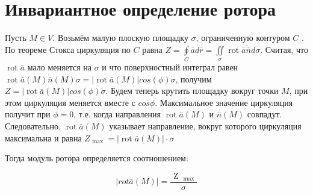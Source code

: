 \section{Инвариантное определение ротора}

Пусть $M \in V$. Возьмём малую плоскую площадку $\sigma$, ограниченную контуром  $C$ .
 По теореме Стокса циркуляция по $C$ равна $Z = \oint \limits_C \bar a d\bar r = \iint\limits _{\sigma}\operatorname{rot} \bar a\dot \bar n d\sigma$. 
Считая, что $\operatorname{rot} \bar a$ мало меняется на $\sigma$ и что поверхностный интеграл равен $\operatorname{rot} \bar a(M)\dot \bar n(M)\sigma = |\operatorname{rot} \bar a(M)|cos(\phi)\dot \sigma$, 
получим $Z=|\operatorname{rot} \bar a(M)|cos(\phi)\dot\sigma$.
Будем теперь крутить площадку вокруг точки  $M$, при этом циркуляция меняется вместе с $cos\phi$. Максимальное значение циркуляция получит при $\phi=0$, т.е. когда направления $\operatorname{rot} \bar a(M)$ и $\bar n(M)$ совпадут. Следовательно, $\operatorname{rot} \bar a(M)$ указывает направление, вокруг которого циркуляция максимальна и равна $Z_{\mbox { max } } =|\operatorname{rot} \bar a(M)| \cdot \sigma$

Тогда модуль ротора определяется соотношением:

$$| rot\bar { a } (M)| =\frac { \mbox { Z } _ { \mbox { max } } } { \sigma } $$

